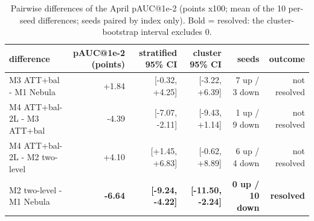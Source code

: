 \begin{table}[t]
\centering
\small
\caption{Pairwise differences of the April pAUC@1e-2 (points x100; mean of the 10 per-seed differences; seeds paired by index only). Bold = resolved: the cluster-bootstrap interval excludes 0.}
\label{tab:T7_pairwise_differences}
\begin{tabular}{lrrrrr}
\toprule
difference & pAUC@1e-2 (points) & stratified 95\% CI & cluster 95\% CI & seeds & outcome \\
\midrule
M3 ATT+bal - M1 Nebula & +1.84 & [-0.32, +4.25] & [-3.22, +6.39] & 7 up / 3 down & not resolved \\
M4 ATT+bal-2L - M3 ATT+bal & -4.39 & [-7.07, -2.11] & [-9.43, +1.14] & 1 up / 9 down & not resolved \\
M4 ATT+bal-2L - M2 two-level & +4.10 & [+1.45, +6.83] & [-0.62, +8.89] & 6 up / 4 down & not resolved \\
M2 two-level - M1 Nebula & \textbf{-6.64} & \textbf{[-9.24, -4.22]} & \textbf{[-11.50, -2.24]} & \textbf{0 up / 10 down} & \textbf{resolved} \\
\bottomrule
\end{tabular}
\end{table}
